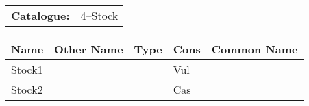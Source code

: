 \begin{tabular}{ p{0.9in} p{1.3in}}
{\bf Catalogue:} & 4--Stock \\ 
\end{tabular}
\begin{longtable}{ p{0.7in}  p{1.0in}  p{0.6in}  p{0.9in}  p{5.1in} }
\hline 
{\bf Name} & {\bf Other Name} & {\bf Type} & {\bf Cons} & {\bf Common Name} \\ 
\hline 
Stock1 &  &  & Vul &  \\ 
Stock2 &  &  & Cas &  \\ 
\hline 
\end{longtable} 
